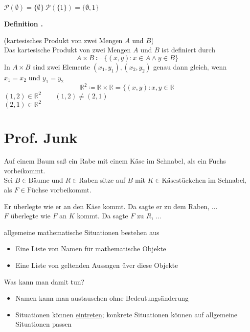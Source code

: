 \documentclass[a4paper]{article}
\newenvironment{Definition}{
	\begin{DefinitionBox}
		{\textbf{Definition \thesection.\definitionnumber}}
		\setlength\parindent{1em}
	}{
		\xdef\definitionnumber{\number\numexpr\definitionnumber+1\relax}
	\end{DefinitionBox}
}
\begin{document}
$\mathcal{P}(\emptyset) = \{\emptyset\}\:\mathcal{P}(\{1\}) = \{\emptyset, 1\}$
\begin{Definition}
	(kartesisches Produkt von zwei Mengen $A$ und $B$)\\
	Das kartesische Produkt von zwei Mengen $A$ und $B$ ist definiert durch
	\[A \times B \coloneqq \{(x,y): x \in A \wedge y \in B\}\]
	In $A \times B$ sind zwei Elemente $(x_1, y_1), (x_2, y_2)$ genau dann gleich, wenn $x_1 = x_2$ und $y_1 = y_2$
	\[\mathbb{R}^2 \coloneqq \mathbb{R} \times \mathbb{R} = \{(x, y): x, y \in \mathbb{R}\]
	\indent\indent $(1,2) \in \mathbb{R}^2 \qquad (1,2) \neq (2,1)$\\
	\indent\indent $(2,1) \in \mathbb{R}^2$
\end{Definition}

\section{Prof. Junk}
Auf einem Baum saß ein Rabe mit einem Käse im Schnabel, als ein Fuchs vorbeikommt.\\
Sei $B \in \text{Bäume}$ und $R \in \text{Raben}$ sitze auf $B$ mit $K \in \text{Käsestückchen}$ im Schnabel, als $F \in \text{Füchse}$ vorbeikommt.\par
Er überlegte wie er an den Käse kommt. Da sagte er zu dem Raben, ...\\
$F$ überlegte wie $F$ an $K$ kommt. Da sagte $F$ zu $R$, ...\\\par

allgemeine mathematische Situationen bestehen aus
\begin{itemize}
	\item Eine Liste von Namen für mathematische Objekte
	\item Eine Liste von geltenden Aussagen üver diese Objekte
\end{itemize}
Was kann man damit tun?
\begin{itemize}
	\item Namen kann man austauschen ohne Bedeutungsänderung
	\item Situationen können \underline{eintreten}; konkrete Situationen können auf allgemeine Situationen passen
\end{itemize}
\end{document}
